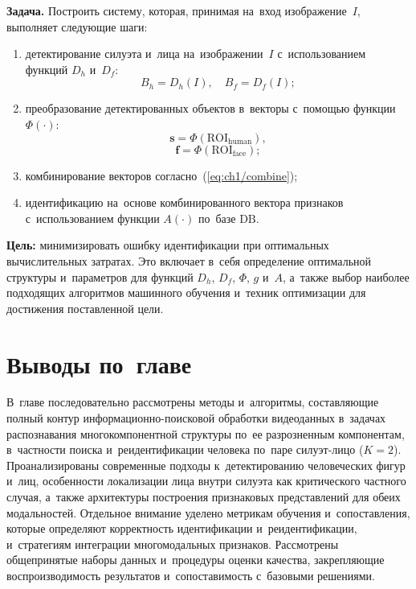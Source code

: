 \textbf{Задача.} Построить систему, которая, принимая на~вход
изображение~$I$, выполняет следующие шаги:
\begin{enumerate}
    \item детектирование силуэта и~лица на~изображении~$I$
          с~использованием функций $D_h$ и~$D_f$:
    \begin{equation}\label{eq:ch1/detect}
        B_h=D_h(I),\quad B_f=D_f(I);
    \end{equation}

    \item преобразование детектированных объектов в~векторы с~помощью
          функции $\Phi(\cdot)$:
    \begin{equation}\label{eq:ch1/emb-h}
        \mathbf{s}=\Phi(\mathrm{ROI}_{\text{human}}),
    \end{equation}
    \begin{equation}\label{eq:ch1/emb-f}
        \mathbf{f}=\Phi(\mathrm{ROI}_{\text{face}});
    \end{equation}

    \item комбинирование векторов согласно~(\ref{eq:ch1/combine});

    \item идентификацию на~основе комбинированного вектора признаков
          с~использованием функции $A(\cdot)$ по~базе $\mathrm{DB}$.
\end{enumerate}

\textbf{Цель:} минимизировать ошибку идентификации при оптимальных
вычислительных затратах. Это включает в~себя определение оптимальной
структуры и~параметров для функций $D_h$, $D_f$, $\Phi$, $g$ и~$A$,
а~также выбор наиболее подходящих алгоритмов машинного обучения
и~техник оптимизации для достижения поставленной цели.

\section{Выводы по~главе}\label{sec:ch1/conclusion}

В~главе последовательно рассмотрены методы и~алгоритмы, составляющие
полный контур информационно-поисковой обработки видеоданных в~задачах
распознавания многокомпонентной структуры по~ее разрозненным компонентам, в~частности поиска
и~реидентификации человека по~паре силуэт-лицо ($K=2$). Проанализированы современные подходы
к~детектированию человеческих фигур и~лиц, особенности локализации лица
внутри силуэта как критического частного случая, а~также архитектуры
построения признаковых представлений для обеих модальностей. Отдельное
внимание уделено метрикам обучения и~сопоставления, которые определяют
корректность идентификации и~реидентификации, и~стратегиям интеграции
многомодальных признаков. Рассмотрены общепринятые наборы данных
и~процедуры оценки качества, закрепляющие воспроизводимость результатов
и~сопоставимость с~базовыми решениями.

